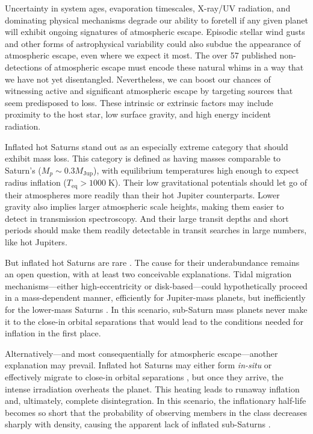 \documentclass[linenumbers, twocolumn, trackchanges]{aastex631}
\begin{document}
Uncertainty in system ages, evaporation timescales, X-ray/UV radiation, and dominating physical mechanisms degrade our ability to foretell if any given planet will exhibit ongoing signatures of atmospheric escape.  Episodic stellar wind gusts and other forms of astrophysical variability could also subdue the appearance of atmospheric escape, even where we expect it most.  The over 57 published non-detections of atmospheric escape \citep{2022arXiv221116243D,2023arXiv230700967G} must encode these natural whims in a way that we have not yet disentangled. Nevertheless, we can boost our chances of witnessing active and significant atmospheric escape by targeting sources that seem predisposed to loss.  These intrinsic or extrinsic factors may include proximity to the host star, low surface gravity, and high energy incident radiation.

Inflated hot Saturns stand out as an especially extreme category that should exhibit mass loss.  This category is defined as having masses comparable to Saturn's ($M_p \sim 0.3 M_\mathrm{Jup}$), with equilibrium temperatures high enough to expect radius inflation ($T_\mathrm{eq}>1000\;$K).  Their low gravitational potentials should let go of their atmospheres more readily than their hot Jupiter counterparts.  Lower gravity also implies larger atmospheric scale heights, making them easier to detect in transmission spectroscopy.  And their large transit depths and short periods should make them readily detectable in transit searches in large numbers, like hot Jupiters.

But inflated hot Saturns are rare \citep{2018AJ....155..214T}.  The cause for their underabundance remains an open question, with at least two conceivable explanations.  Tidal migration mechanisms---either high-eccentricity or disk-based---could hypothetically proceed in a mass-dependent manner, efficiently for Jupiter-mass planets, but inefficiently for the lower-mass Saturns \citep{2018AJ....155..214T,2018ARA&A..56..175D}.  In this scenario, sub-Saturn mass planets never make it to the close-in orbital separations that would lead to the conditions needed for inflation in the first place.

Alternatively---and most consequentially for atmospheric escape---another explanation may prevail.  Inflated hot Saturns may either form \emph{in-situ} or effectively migrate to close-in orbital separations \citep{2018ARA&A..56..175D}, but once they arrive, the intense irradiation overheats the planet.  This heating leads to runaway inflation and, ultimately, complete disintegration.  In this scenario, the inflationary half-life becomes so short that the probability of observing members in the class decreases sharply with density, causing the apparent lack of inflated sub-Saturns \citep{2023ApJ...945L..36T}.
\end{document}
